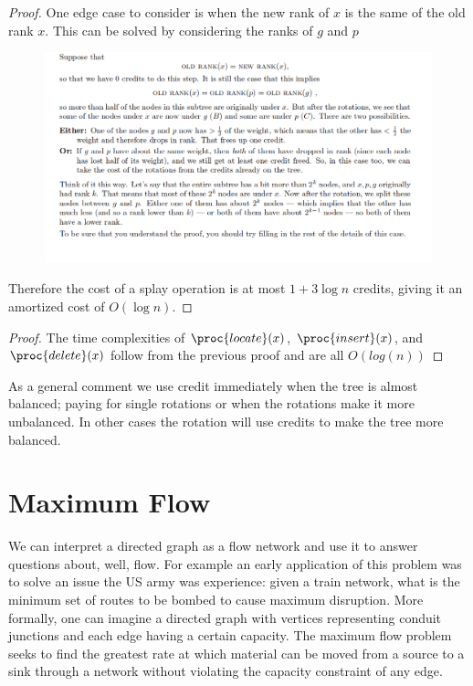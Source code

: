 \documentclass[../notes.tex]{subfiles}
\begin{document}
\begin{proof}
One edge case to consider is when the new rank of $ x $ is the same of the old rank $ x $. This can be solved by considering the ranks of $ g $ and $ p $

\begin{figure}[H]
	\centering
	\includegraphics[width=0.8\linewidth]{img/image_2022-11-25-23-41-12.png}
\end{figure}

	Therefore the cost of a splay operation is at most $ 1 + 3 \log n $ credits, giving it an amortized cost of $ O(\log n) $.
	
	
\end{proof}

\begin{proof}
	The time complexities of $ \proc{locate}(x)$, $ \proc{insert}(x) $, and $ \proc{delete}(x) $ follow from the previous proof and are all $ O(log(n)) $
\end{proof}






As a general comment we use credit immediately when the tree is almost balanced; paying for single rotations or when the rotations make it more unbalanced. In other cases the rotation will use credits to make the tree more balanced.





\section{Maximum Flow}

We can interpret a directed graph as a flow network and use it to answer questions about, well, flow.
For example an early application of this problem was to solve an issue the US army was experience: given a train network, what is the minimum set of routes to be bombed to cause maximum disruption.
More formally, one can imagine a directed graph with vertices representing conduit junctions and each edge having a certain capacity.
The maximum flow problem seeks to find the greatest rate at which material can be moved from a source to a sink through a network without violating the capacity constraint of any edge.
\end{document}
